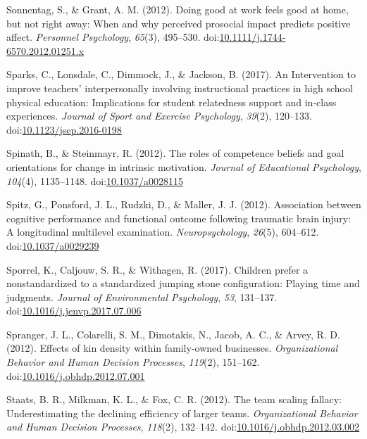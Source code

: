 \documentclass[english,man]{apa6}
\begin{document}
\hypertarget{ref-Sonnentag2012}{}
Sonnentag, S., \& Grant, A. M. (2012). Doing good at work feels good at
home, but not right away: When and why perceived prosocial impact
predicts positive affect. \emph{Personnel Psychology}, \emph{65}(3),
495--530.
doi:\href{https://doi.org/10.1111/j.1744-6570.2012.01251.x}{10.1111/j.1744-6570.2012.01251.x}

\hypertarget{ref-Sparks2017}{}
Sparks, C., Lonsdale, C., Dimmock, J., \& Jackson, B. (2017). An
Intervention to improve teachers' interpersonally involving
instructional practices in high school physical education: Implications
for student relatedness support and in-class experiences. \emph{Journal
of Sport and Exercise Psychology}, \emph{39}(2), 120--133.
doi:\href{https://doi.org/10.1123/jsep.2016-0198}{10.1123/jsep.2016-0198}

\hypertarget{ref-Spinath2012}{}
Spinath, B., \& Steinmayr, R. (2012). The roles of competence beliefs
and goal orientations for change in intrinsic motivation. \emph{Journal
of Educational Psychology}, \emph{104}(4), 1135--1148.
doi:\href{https://doi.org/10.1037/a0028115}{10.1037/a0028115}

\hypertarget{ref-Spitz2012}{}
Spitz, G., Ponsford, J. L., Rudzki, D., \& Maller, J. J. (2012).
Association between cognitive performance and functional outcome
following traumatic brain injury: A longitudinal multilevel examination.
\emph{Neuropsychology}, \emph{26}(5), 604--612.
doi:\href{https://doi.org/10.1037/a0029239}{10.1037/a0029239}

\hypertarget{ref-Sporrel2017}{}
Sporrel, K., Caljouw, S. R., \& Withagen, R. (2017). Children prefer a
nonstandardized to a standardized jumping stone configuration: Playing
time and judgments. \emph{Journal of Environmental Psychology},
\emph{53}, 131--137.
doi:\href{https://doi.org/10.1016/j.jenvp.2017.07.006}{10.1016/j.jenvp.2017.07.006}

\hypertarget{ref-Spranger2012}{}
Spranger, J. L., Colarelli, S. M., Dimotakis, N., Jacob, A. C., \&
Arvey, R. D. (2012). Effects of kin density within family-owned
businesses. \emph{Organizational Behavior and Human Decision Processes},
\emph{119}(2), 151--162.
doi:\href{https://doi.org/10.1016/j.obhdp.2012.07.001}{10.1016/j.obhdp.2012.07.001}

\hypertarget{ref-Staats2012}{}
Staats, B. R., Milkman, K. L., \& Fox, C. R. (2012). The team scaling
fallacy: Underestimating the declining efficiency of larger teams.
\emph{Organizational Behavior and Human Decision Processes},
\emph{118}(2), 132--142.
doi:\href{https://doi.org/10.1016/j.obhdp.2012.03.002}{10.1016/j.obhdp.2012.03.002}
\end{document}
